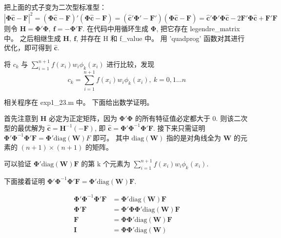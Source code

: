 \documentclass[11pt]{ctexart}
\begin{document}
	把上面的式子变为二次型标准型：
	\begin{equation}
		|\mathbf{\Phi} \mathbf{\hat{c}}-\mathbf F|^2=(\mathbf{\Phi} \mathbf {\hat{c}}-\mathbf F)'(\mathbf{\Phi} \mathbf {\hat{c}}-\mathbf F)=
		(\mathbf{\hat{c}}'\mathbf{\Phi}'-\mathbf{F}')(\mathbf{\Phi} \mathbf {\hat{c}}-\mathbf F)=
		\mathbf{\hat{c}}'\mathbf{\Phi}'\mathbf{\Phi}\mathbf{\hat{c}}-2\mathbf{F}'\mathbf{\Phi}\mathbf{\hat{c}}+\mathbf{F}'\mathbf{F}
	\end{equation}
	则令 \(\mathbf{H}=\mathbf{\Phi'\Phi},\ \mathbf{f}=-\mathbf{\Phi' F}\).
	在代码中用循环生成 \(\mathbf{\Phi}\), 把它存在 legendre\_matrix 中。
	之后相继生成 \(\mathbf{H},\ \mathbf{f}\), 并存在 H 和 f\_value 中。
	用 'quadprog' 函数对其进行优化，即可得到 \(\mathbf{\hat{c}}\).

	将 \(c_k\) 与 \(\sum_{i=1}^{n+1}f\left(x_{i}\right) w_{i} \phi_{k}\left(x_{i}\right)\) 进行比较，发现
	\begin{equation}
		c_k=\sum_{i=1}^{n+1}f\left(x_{i}\right) w_{i} \phi_{k}\left(x_{i}\right),\ k=0,1\dots n
	\end{equation}

	相关程序在 exp1\_23.m 中。
	下面给出数学证明。

	首先注意到 \(\mathbf{H}\) 必定为正定矩阵，因为 \(\mathbf{\Phi'\Phi}\) 的所有特征值必定都大于 0.
	则该二次型的最优解为 \(\mathbf{\hat{c}}=\mathbf{H}^{-1}\mathbf{(-F)}\), 即 \(\mathbf{\hat{c}}=\mathbf{\Phi'\Phi}^{-1}\mathbf{\Phi' F}\).
	接下来只需证明 \(\mathbf{\Phi'\Phi}^{-1}\mathbf{\Phi' F}=\mathbf{\Phi'}\text{diag}(\mathbf{W})F\) 即可。
	其中 \(\text{diag}(\mathbf{W})\) 指的是对角线全为 \(\mathbf{W}\) 的元素的 \((n+1)\times (n+1)\) 的矩阵。

	可以验证 \(\mathbf{\Phi'}\text{diag}(\mathbf{W})\mathbf{F}\) 的第 k 个元素为 \(\sum_{i=1}^{n+1}f\left(x_{i}\right) w_{i} \phi_{k}\left(x_{i}\right)\).

	下面接着证明 \(\mathbf{\Phi'\Phi}^{-1}\mathbf{\Phi' F}=\mathbf{\Phi'}\text{diag}(\mathbf{W})\mathbf{F}\).

	\begin{equation}
		\begin{aligned}
			\mathbf{\Phi'\Phi}^{-1}\mathbf{\Phi' F} &=\mathbf{\Phi'}\text{diag}(\mathbf{W})\mathbf{F} \\
			\mathbf{\Phi' F} &=\mathbf{\Phi'\Phi}\mathbf{\Phi'}\text{diag}(\mathbf{W})\mathbf{F} \\
			\mathbf{F} &=\mathbf{\Phi}\mathbf{\Phi'}\text{diag}(\mathbf{W})\mathbf{F} \\
			\mathbf{I} &=\mathbf{\Phi}\mathbf{\Phi'}\text{diag}(\mathbf{W})
		\end{aligned}
	\end{equation}
\end{document}
